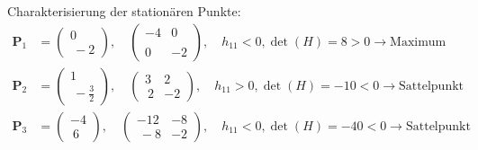 {Charakterisierung der stationären Punkte:
\begin{align*}
\boldsymbol{P}_1 &= \begin{pmatrix} 0 \\\ -2 \end{pmatrix}, \quad \begin{pmatrix} -4 & 0 \\\\ 0 & -2 \end{pmatrix}, \quad h_{11}<0, \det(H)=8>0 \rightarrow \mbox{Maximum}\\
\boldsymbol{P}_2 &= \begin{pmatrix} 1 \\\ -\frac32 \end{pmatrix}, \quad \begin{pmatrix} 3 & 2 \\\ 2 & -2 \end{pmatrix}, \quad h_{11}>0, \det(H)=-10<0 \rightarrow \mbox{Sattelpunkt}\\
\boldsymbol{P}_3 &= \begin{pmatrix} -4 \\\ 6 \end{pmatrix}, \quad \begin{pmatrix} -12 & -8 \\\ -8 & -2 \end{pmatrix}, \quad h_{11}<0, \det(H)=-40<0 \rightarrow \mbox{Sattelpunkt}
\end{align*}

}
